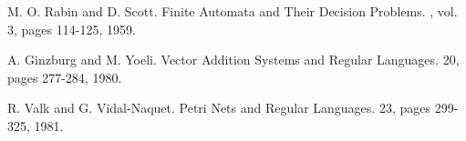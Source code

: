 \documentclass[a4paper,final]{article}
\theoremstyle{definition}
\begin{document}

\begin{thebibliography}{10}

M. O. Rabin and D. Scott.
\newblock Finite Automata and Their Decision Problems.
, vol. 3, pages 114-125, 1959.

A. Ginzburg and M. Yoeli.
\newblock Vector Addition Systems and Regular Languages.
 20, pages 277-284, 1980.

R. Valk and G. Vidal-Naquet.
\newblock Petri Nets and Regular Languages.
 23, pages 299-325, 1981.

\end{thebibliography}
\end{document}
